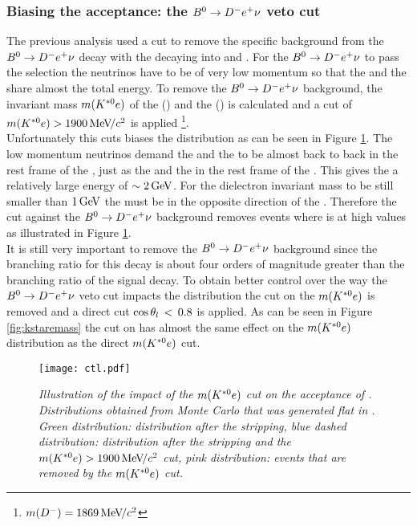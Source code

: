 \subsubsection{Biasing the \ctl acceptance: the $B^0 \rightarrow D^- e^+ \nu$ veto cut}
\label{sec:denu}
The previous analysis used a cut to remove the specific background from the $B^0 \rightarrow D^- e^+ \nu$ decay with the \Dm decaying into \en \Kstarz and \neu. For the $B^0 \rightarrow D^- e^+ \nu $ to pass the \BdKstee selection the neutrinos have to be of very low momentum so that the \Kstarz and the \en share almost the total \Dm energy. To remove the $B^0 \rightarrow D^- e^+ \nu $ background, the invariant mass $m(K^{*0} e)$ of the \Kstarz (\Kstarzb) and the \en (\ep) is calculated and a cut of $m(K^{*0} e) > 1900 {\mathrm{\,Me\kern -0.1em V\!/}c^2} $ is applied \footnote{$m(D^-) = 1869 {\mathrm{\,Me\kern -0.1em V\!/}c^2}$\cite{pdg}}.\\
Unfortunately this cuts biases the \ctl distribution as can be seen in Figure \ref{fig:ctl}. The low momentum neutrinos demand the \Kstarz and the \en to be almost back to back in the rest frame of the \Dm, just as the \Dm and the \ep in the rest frame of the \Bd. This gives the \ep a relatively large energy of $\sim 2 \mathrm{\,Ge\kern -0.1em V}$. For the dielectron invariant mass to be still smaller than $1 \mathrm{\,Ge\kern -0.1em V}$ the \en must be in the opposite direction of the \ep. Therefore the cut against the $B^0 \rightarrow D^- e^+ \nu$ background removes events where \ctl is at high values as illustrated in Figure \ref{fig:ctl}.\\
It is still very important to remove the $B^0 \rightarrow D^- e^+ \nu$ background since the branching ratio for this decay is about four orders of magnitude greater than the branching ratio of the signal decay. To obtain better control over the way the $B^0 \rightarrow D^- e^+ \nu$ veto cut impacts the \ctl distribution the cut on the $m(K^{*0} e)$ is removed and a direct cut $\cos{\theta_l} \, < \, 0.8$ is applied. As can be seen in Figure \ref{fig:kstaremass} the cut on \ctl has almost the same effect on the $m(K^{*0} e)$ distribution as the direct $m(K^{*0} e)$ cut.
\begin{figure}[!h]
\begin{center}
\texttt{[image: ctl.pdf]}
\end{center}
\vspace*{-0.5cm}
\caption{\textit{Illustration of the impact of the $m(K^{*0} e)$ cut on the acceptance of \ctl. Distributions obtained from \BdKstee Monte Carlo that was generated flat in \ctl. Green distribution: \ctl distribution after the stripping, blue dashed distribution: \ctl distribution after the stripping and the  $m(K^{*0} e) > 1900 {\mathrm{\,Me\kern -0.1em V\!/}c^2} $ cut, pink distribution: events that are removed by the $m(K^{*0} e)$ cut.}}
\label{fig:ctl}
\end{figure}

